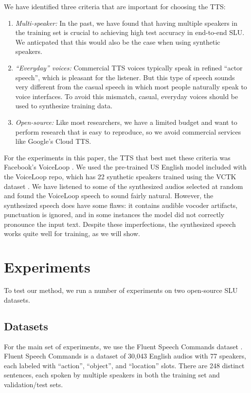 \documentclass{article}
\begin{document}
We have identified three criteria that are important for choosing the TTS: 
\begin{enumerate}
     \item \textit{Multi-speaker:} In the past, we have found that having multiple speakers in the training set is crucial to achieving high test accuracy in end-to-end SLU. We anticpated that this would also be the case when using synthetic speakers.
    \item \textit{``Everyday'' voices:} Commercial TTS voices typically speak in refined ``actor speech'', which is pleasant for the listener. But this type of speech sounds very different from the casual speech in which most people naturally speak to voice interfaces. To avoid this mismatch, casual, everyday voices should be used to synthesize training data.
    \item \textit{Open-source:} Like most researchers, we have a limited budget and want to perform research that is easy to reproduce, so we avoid commercial services like Google's Cloud TTS.
\end{enumerate}
   
For the experiments in this paper, the TTS that best met these criteria was Facebook's VoiceLoop \cite{taigman2017voice}. We used the pre-trained US English model included with the VoiceLoop repo, which has 22 synthetic speakers trained using the VCTK dataset \cite{veaux2017cstr}. We have listened to some of the synthesized audios selected at random and found the VoiceLoop speech to sound fairly natural. However, the synthesized speech does have some flaws: it contains audible vocoder artifacts, punctuation is ignored, and in some instances the model did not correctly pronounce the input text.  Despite these imperfections, the synthesized speech works quite well for training, as we will show.

\section{Experiments}
\label{sec:experiments}

To test our method, we run a number of experiments on two open-source SLU datasets.

\subsection{Datasets}
For the main set of experiments, we use the
Fluent Speech Commands dataset \cite{Lugosch2019}. Fluent Speech Commands is a dataset of 30,043 English audios with 77 speakers, each labeled with ``action'', ``object'', and ``location'' slots. There are 248 distinct sentences, each spoken by multiple speakers in both the training set and validation/test sets.
\end{document}
